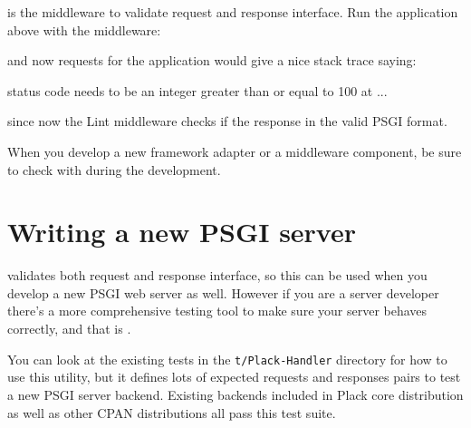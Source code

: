  is the middleware to validate request and response
interface. Run the application above with the middleware:


and now requests for the application would give a nice stack trace
saying:

\begin{shell}
status code needs to be an integer greater than or equal to 100 at ...
\end{shell}
%
since now the Lint middleware checks if the response in the valid PSGI
format.

When you develop a new framework adapter or a middleware component, be
sure to check with  during the development.

\section{Writing a new PSGI server}\label{writing-a-new-psgi-server}

 validates both request and response interface, so this
can be used when you develop a new PSGI web server as well. However if
you are a server developer there's a more comprehensive testing tool to
make sure your server behaves correctly, and that is .

You can look at the existing tests in the \lstinline!t/Plack-Handler!
directory for how to use this utility, but it defines lots of expected
requests and responses pairs to test a new PSGI server backend. Existing
 backends included in Plack core distribution as well as
other CPAN distributions all pass this test suite.


